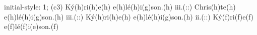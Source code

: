 initial-style: 1;
(c3) Ký(h)ri(h)e(h) e(h)lé(h)i(g)son.(h) iii.(::) Chris(h)te(h) e(h)lé(h)i(g)son.(h) iii.(::) Ký(h)ri(h)e(h) e(h)lé(h)i(g)son.(h) ii.(::) Ký(f)ri(f)e(f) e(f)lé(f)i(e)son.(f)